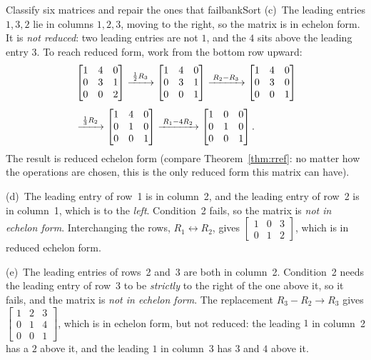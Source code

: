 \documentclass[11pt]{article}
\begin{document}
\begin{exmp}{Classify six matrices and repair the ones that fail}{bankSort}
(c)~The leading entries $1,3,2$ lie in columns $1,2,3$, moving to the right, so the matrix is in echelon form. It is \emph{not reduced}: two leading entries are not $1$, and the $4$ sits above the leading entry $3$. To reach reduced form, work from the bottom row upward:
\begin{align*}
&\begin{bmatrix}1&4&0\\0&3&1\\0&0&2\end{bmatrix}
\xrightarrow{\;\frac12R_3\;}
\begin{bmatrix}1&4&0\\0&3&1\\0&0&1\end{bmatrix}
\xrightarrow{\;R_2-R_3\;}
\begin{bmatrix}1&4&0\\0&3&0\\0&0&1\end{bmatrix}\\[4pt]
&
\xrightarrow{\;\frac13R_2\;}
\begin{bmatrix}1&4&0\\0&1&0\\0&0&1\end{bmatrix}
\xrightarrow{\;R_1-4R_2\;}
\begin{bmatrix}1&0&0\\0&1&0\\0&0&1\end{bmatrix}.
\end{align*}
The result is reduced echelon form (compare Theorem~\ref{thm:rref}: no matter how the operations are chosen, this is the only reduced form this matrix can have).

(d)~The leading entry of row~1 is in column~2, and the leading entry of row~2 is in column~1, which is to the \emph{left}. Condition~2 fails, so the matrix is \emph{not in echelon form}. Interchanging the rows, $R_1\leftrightarrow R_2$, gives $\begin{bmatrix}1&0&3\\0&1&2\end{bmatrix}$, which is in reduced echelon form.

(e)~The leading entries of rows~2 and~3 are both in column~2. Condition~2 needs the leading entry of row~3 to be \emph{strictly} to the right of the one above it, so it fails, and the matrix is \emph{not in echelon form}. The replacement $R_3-R_2\to R_3$ gives $\begin{bmatrix}1&2&3\\0&1&4\\0&0&1\end{bmatrix}$, which is in echelon form, but not reduced: the leading $1$ in column~2 has a $2$ above it, and the leading $1$ in column~3 has $3$ and $4$ above it.


\end{exmp}
\end{document}
